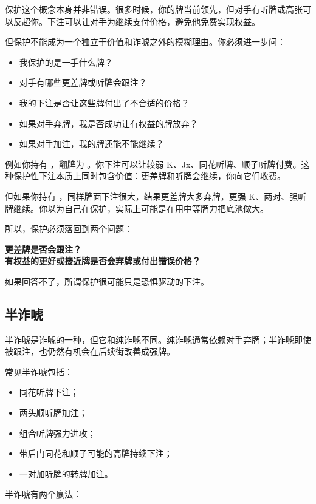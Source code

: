 保护这个概念本身并非错误。很多时候，你的牌当前领先，但对手有听牌或高张可以反超你。下注可以让对手为继续支付价格，避免他免费实现权益。

但保护不能成为一个独立于价值和诈唬之外的模糊理由。你必须进一步问：

\begin{itemize}
\item 我保护的是一手什么牌？
\item 对手有哪些更差牌或听牌会跟注？
\item 我的下注是否让这些牌付出了不合适的价格？
\item 如果对手弃牌，我是否成功让有权益的牌放弃？
\item 如果对手加注，我的牌还能不能继续？
\end{itemize}

例如你持有 ，翻牌为 。你下注可以让较弱 K、Jx、同花听牌、顺子听牌付费。这种保护性下注本质上同时包含价值：更差牌和听牌会继续，你向它们收费。

但如果你持有 ，同样牌面下注很大，结果更差牌大多弃牌，更强 K、两对、强听牌继续。你以为自己在保护，实际上可能是在用中等牌力把底池做大。

所以，保护必须落回到两个问题：

\begin{center}
\textbf{更差牌是否会跟注？\\
有权益的更好或接近牌是否会弃牌或付出错误价格？}
\end{center}

如果回答不了，所谓保护很可能只是恐惧驱动的下注。

\subsection{半诈唬}

半诈唬是诈唬的一种，但它和纯诈唬不同。纯诈唬通常依赖对手弃牌；半诈唬即使被跟注，也仍然有机会在后续街改善成强牌。

常见半诈唬包括：

\begin{itemize}
\item 同花听牌下注；
\item 两头顺听牌加注；
\item 组合听牌强力进攻；
\item 带后门同花和顺子可能的高牌持续下注；
\item 一对加听牌的转牌加注。
\end{itemize}

半诈唬有两个赢法：

